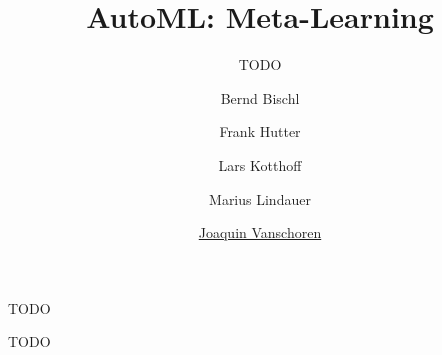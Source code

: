 



\title[AutoML: Risks]{AutoML: Meta-Learning} %
\subtitle{TODO} %
\author[Marius Lindauer]{Bernd Bischl \and Frank Hutter \and Lars Kotthoff\newline \and Marius Lindauer \and \underline{Joaquin Vanschoren}}
\institute{}
\date{}



	
	\maketitle
	

\begin{frame}[c]{TODO}

TODO

\end{frame}


